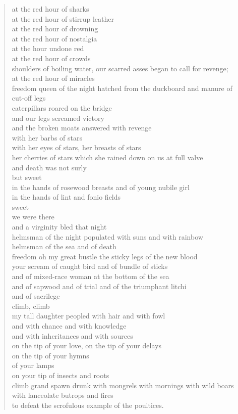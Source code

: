 \documentclass[letterpaper,article,12pt,oneside,notitlepage]{memoir}
\begin{document}
\begin{verse}
at the red hour of sharks \\
at the red hour of stirrup leather \\
at the red hour of drowning \\
at the red hour of nostalgia \\
at the hour undone red \\
at the red hour of crowds \\
shoulders of boiling water, our scarred asses began to call for revenge; \\
at the red hour of miracles \\
freedom queen of the night hatched from the duckboard and manure of cut-off legs \\
caterpillars roared on the bridge \\
and our legs screamed victory \\
and the broken moats answered with revenge \\
with her barbs of stars \\
with her eyes of stars, her breasts of stars \\
her cherries of stars which she rained down on us at full valve \\
and death was not surly \\
but sweet \\
in the hands of rosewood breasts and of young nubile girl \\
in the hands of lint and fonio fields \\
sweet \\
we were there \\
and a virginity bled that night \\
helmsman of the night populated with suns and with rainbow \\
helmsman of the sea and of death \\
freedom oh my great bustle the sticky legs of the new blood \\
your scream of caught bird and of bundle of sticks \\
and of mixed-race woman at the bottom of the sea \\
and of sapwood and of trial and of the triumphant litchi \\
and of sacrilege \\
climb, climb \\
my tall daughter peopled with hair and with fowl \\
and with chance and with knowledge \\
and with inheritances and with sources \\
on the tip of your love, on the tip of your delays \\
on the tip of your hymns \\
of your lamps \\
on your tip of insects and roots \\
climb grand spawn drunk with mongrels with mornings with wild boars \\
with lanceolate butrops and fires \\
to defeat the scrofulous example of the poultices. \\
\end{verse}
\end{document}
